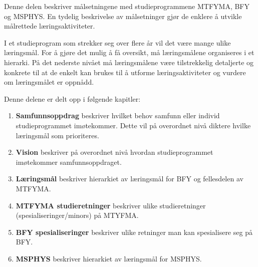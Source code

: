 Denne delen beskriver målsetningene med studieprogrammene MTFYMA, BFY og MSPHYS. En tydelig beskrivelse av målsetninger gjør de enklere å utvikle målrettede læringsaktiviteter.

I et studieprogram som strekker seg over flere år vil det være mange ulike læringsmål. For å gjøre det mulig å få oversikt, må læringsmålene organiseres i et hierarki. På det nederste nivået må læringsmålene være tilstrekkelig detaljerte og konkrete til at de enkelt kan brukes til å utforme læringsaktiviteter og vurdere om læringsmålet er oppnådd.

Denne delene er delt opp i følgende kapitler:

\begin{enumerate}
   \item \textbf{Samfunnsoppdrag} beskriver hvilket behov samfunn eller individ studieprogrammet imøtekommer. Dette vil på overordnet nivå diktere hvilke læringsmål som prioriteres.
   \item \textbf{Vision} beskriver på overordnet nivå hvordan studieprogrammet imøtekommer samfunnsoppdraget.
   \item \textbf{Læringsmål} beskriver hierarkiet av læringsmål for BFY og fellesdelen av MTFYMA.
   \item \textbf{MTFYMA studieretninger} beskriver ulike studieretninger (spesialiseringer/minors) på MTYFMA.
   \item \textbf{BFY spesialiseringer} beskriver ulike retninger man kan spesialisere seg på BFY.
   \item \textbf{MSPHYS} beskriver hierarkiet av læringsmål for MSPHYS.
\end{enumerate}